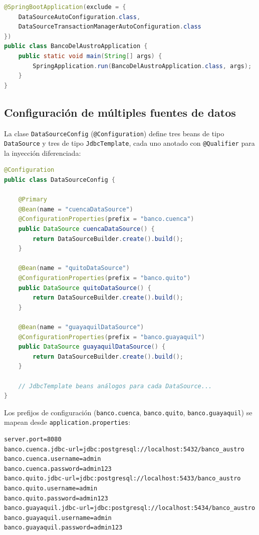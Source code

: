 \documentclass[12pt, a4paper]{article}
\begin{document}
\begin{lstlisting}[language=Java, caption={Clase principal con exclusión de auto-configuración}]
@SpringBootApplication(exclude = {
    DataSourceAutoConfiguration.class,
    DataSourceTransactionManagerAutoConfiguration.class
})
public class BancoDelAustroApplication {
    public static void main(String[] args) {
        SpringApplication.run(BancoDelAustroApplication.class, args);
    }
}
\end{lstlisting}

\subsection{Configuración de múltiples fuentes de datos}
La clase \texttt{DataSourceConfig} (\texttt{@Configuration}) define tres beans de tipo \texttt{DataSource} y tres de tipo \texttt{JdbcTemplate}, cada uno anotado con \texttt{@Qualifier} para la inyección diferenciada:

\begin{lstlisting}[language=Java, caption={Configuración de DataSource y JdbcTemplate por nodo}]
@Configuration
public class DataSourceConfig {

    @Primary
    @Bean(name = "cuencaDataSource")
    @ConfigurationProperties(prefix = "banco.cuenca")
    public DataSource cuencaDataSource() {
        return DataSourceBuilder.create().build();
    }

    @Bean(name = "quitoDataSource")
    @ConfigurationProperties(prefix = "banco.quito")
    public DataSource quitoDataSource() {
        return DataSourceBuilder.create().build();
    }

    @Bean(name = "guayaquilDataSource")
    @ConfigurationProperties(prefix = "banco.guayaquil")
    public DataSource guayaquilDataSource() {
        return DataSourceBuilder.create().build();
    }

    // JdbcTemplate beans análogos para cada DataSource...
}
\end{lstlisting}

Los prefijos de configuración (\texttt{banco.cuenca}, \texttt{banco.quito}, \texttt{banco.guayaquil}) se mapean desde \texttt{application.properties}:

\begin{lstlisting}[caption={Propiedades de conexión}]
server.port=8080
banco.cuenca.jdbc-url=jdbc:postgresql://localhost:5432/banco_austro
banco.cuenca.username=admin
banco.cuenca.password=admin123
banco.quito.jdbc-url=jdbc:postgresql://localhost:5433/banco_austro
banco.quito.username=admin
banco.quito.password=admin123
banco.guayaquil.jdbc-url=jdbc:postgresql://localhost:5434/banco_austro
banco.guayaquil.username=admin
banco.guayaquil.password=admin123
\end{lstlisting}
\end{document}
